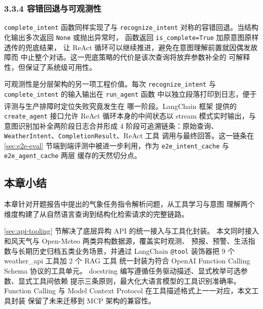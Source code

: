 \documentclass[a4paper]{article}
\theoremstyle{definition}
\theoremstyle{plain}
\theoremstyle{remark}
\let\oldcite\cite
\renewcommand{\cite}[1]{\textsuperscript{\oldcite{#1}}}
\newcommand{\bk}{\discretionary{}{}{}}
\begin{document}
\subsubsection*{3.3.4 \quad 容错回退与可观测性}

\texttt{complete\_\bk{}intent} 函数同样实现了与 \texttt{recognize\_\bk{}intent}
对称的容错回退。当结构化输出多次返回 \texttt{None} 或抛出异常时，
函数返回 \texttt{is\_\bk{}complete=\bk{}True} 加原意图原样透传的兜底结果，
让 ReAct 循环可以继续推进，避免在意图理解前置就因偶发故障而
中止整个对话。这一兜底策略的代价是该次查询将放弃参数补全的
可解释性，但保证了系统级可用性。

可观测性是分层架构的另一项工程价值。每次 \texttt{recognize\_\bk{}intent}
与 \texttt{complete\_\bk{}intent} 的输入输出在 \texttt{run\_\bk{}agent} 函数
中以独立段落打印到日志，便于评测与生产排障时定位失败究竟发生在
哪一阶段。LangChain 框架 \cite{ref15} 提供的 \texttt{create\_\bk{}agent}
接口允许 ReAct 循环本身的中间状态以 stream 模式实时输出，与
意图识别加补全两阶段日志合并形成 4 阶段可追溯链条：原始查询、
\texttt{WeatherIntent}、\texttt{CompletionResult}、ReAct 工具
调用与最终回答。这一链条在
\ref{sec:e2e-eval} 节端到端评测中被进一步利用，作为
\texttt{e2e\_\bk{}intent\_\bk{}cache} 与 \texttt{e2e\_\bk{}agent\_\bk{}cache} 两层
缓存的天然切分点。




\subsection{本章小结}
\label{sec:retrieval-summary}

本章针对开题报告中提出的气象任务指令解析问题，从工具学习与意图
理解两个维度构建了从自然语言查询到结构化检索请求的完整链路。

\ref{sec:api-tooling} 节解决了底层异构 API 的统一接入与工具化封装。
本文同时接入和风天气与 Open-Meteo 两类异构数据源，覆盖实时观测、
预报、预警、生活指数与长期历史归档五类业务场景，并通过 LangChain
\texttt{@tool} 装饰器把 9 个 weather\_api 工具加 2 个 RAG 工具
统一封装为符合 OpenAI Function Calling Schema 协议的工具单元。
docstring 编写遵循任务驱动描述、显式枚举可选参数、显式工具间依赖
提示三条原则，最大化大语言模型的工具识别准确率。Function Calling
与 Model Context Protocol 在工具描述格式上一一对应，本文工具封装
保留了未来迁移到 MCP 架构的兼容性。
\end{document}
